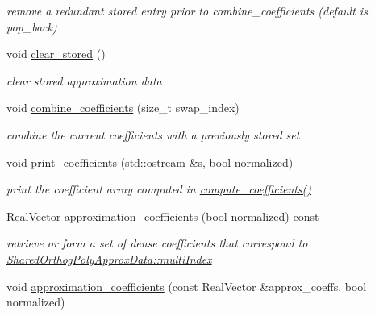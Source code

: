 \begin{DoxyCompactItemize}
\begin{DoxyCompactList}\small\item\em remove a redundant stored entry prior to combine\+\_\+coefficients (default is pop\+\_\+back) \end{DoxyCompactList}\item 
void \hyperlink{classPecos_1_1OrthogPolyApproximation_ae4337960917eda26a5672e5c6afbb62a}{clear\+\_\+stored} ()\label{classPecos_1_1OrthogPolyApproximation_ae4337960917eda26a5672e5c6afbb62a}

\begin{DoxyCompactList}\small\item\em clear stored approximation data \end{DoxyCompactList}\item 
void \hyperlink{classPecos_1_1OrthogPolyApproximation_a7c794213befc83c9f90137f22e4cd39d}{combine\+\_\+coefficients} (size\+\_\+t swap\+\_\+index)\label{classPecos_1_1OrthogPolyApproximation_a7c794213befc83c9f90137f22e4cd39d}

\begin{DoxyCompactList}\small\item\em combine the current coefficients with a previously stored set \end{DoxyCompactList}\item 
void \hyperlink{classPecos_1_1OrthogPolyApproximation_a4beb4a3300443171ac2233e87c970e39}{print\+\_\+coefficients} (std\+::ostream \&s, bool normalized)\label{classPecos_1_1OrthogPolyApproximation_a4beb4a3300443171ac2233e87c970e39}

\begin{DoxyCompactList}\small\item\em print the coefficient array computed in \hyperlink{classPecos_1_1PolynomialApproximation_aef8f0c32bdeff7756a9c614607c03058}{compute\+\_\+coefficients()} \end{DoxyCompactList}\item 
Real\+Vector \hyperlink{classPecos_1_1OrthogPolyApproximation_ac64f16ff9fbfb80c4bafa969b4a92e1d}{approximation\+\_\+coefficients} (bool normalized) const \label{classPecos_1_1OrthogPolyApproximation_ac64f16ff9fbfb80c4bafa969b4a92e1d}

\begin{DoxyCompactList}\small\item\em retrieve or form a set of dense coefficients that correspond to \hyperlink{classPecos_1_1SharedOrthogPolyApproxData_a0fbdd5817bc6dd026f6d42269ca8e703}{Shared\+Orthog\+Poly\+Approx\+Data\+::multi\+Index} \end{DoxyCompactList}\item 
void \hyperlink{classPecos_1_1OrthogPolyApproximation_a2e7b82322962df3fd036b9e0783d8fc9}{approximation\+\_\+coefficients} (const Real\+Vector \&approx\+\_\+coeffs, bool normalized)\label{classPecos_1_1OrthogPolyApproximation_a2e7b82322962df3fd036b9e0783d8fc9}


\end{DoxyCompactItemize}
